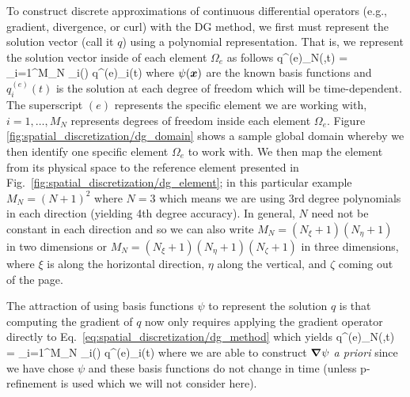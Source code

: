 \documentclass[12pt]{article}
\begin{document}
To construct discrete approximations of continuous differential operators (e.g., gradient, divergence, or curl) with the DG method, we first must represent the solution vector (call it $q$) using a polynomial representation.  That is, we represent the solution vector inside of each element $\Omega_e$ as follows
\be
q^{(e)}_N(,t) = \sum_{i=1}^{M_N} \psi_i() q^{(e)}_i(t)
\label{eq:spatial_discretization/dg_method}
\ee
where $\psi(\mbox{\boldmath$x$\unboldmath})$ are the known basis functions and $q^{(e)}_i(t)$ is the solution at each degree of freedom which will be time-dependent.
The superscript $(e)$ represents the specific element we are working with, $i=1,\ldots,M_N$ represents degrees of freedom inside each element $\Omega_e$.  Figure \ref{fig:spatial_discretization/dg_domain} shows a sample global domain whereby we then identify one specific element $\Omega_e$ to work with.  We then map the element from its physical space to the reference element presented in Fig.\ \ref{fig:spatial_discretization/dg_element}; in this particular example $M_N=(N+1)^2$ where $N=3$ which means we are using 3rd degree polynomials in each direction (yielding 4th degree accuracy).  In general, $N$ need not be constant in each direction and so we can also write $M_N=(N_{\xi}+1)(N_{\eta}+1)$ in two dimensions or $M_N=(N_{\xi}+1)(N_{\eta}+1)(N_{\zeta}+1)$ in three dimensions, where $\xi$ is along the horizontal direction, $\eta$ along the vertical, and $\zeta$ coming out of the page. 

The attraction of using basis functions $\psi$ to represent the solution $q$ is that computing the gradient of $q$ now only requires applying the gradient operator directly to Eq.\ \eqref{eq:spatial_discretization/dg_method} which yields
\be
\nabla q^{(e)}_N(,t) = \sum_{i=1}^{M_N} \nabla \psi_i() q^{(e)}_i(t)
\label{eq:spatial_discretization/dg_method/gradient}
\ee
where we are able to construct $\mbox{\boldmath$\nabla$\unboldmath} \psi$ \emph{a priori} since we have chose $\psi$ and these basis functions do not change in time (unless p-refinement is used which we will not consider here).
\end{document}

